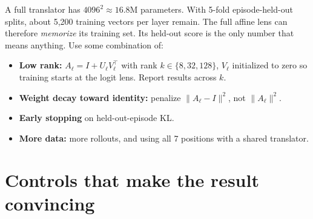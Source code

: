 \documentclass[11pt]{article}
\begin{document}
\begin{pitfall}
A full translator has $4096^2 \approx 16.8$M parameters. With 5-fold episode-held-out splits, about 5{,}200 training vectors per layer remain. The full affine lens can therefore \emph{memorize} its training set. Its held-out score is the only number that means anything. Use some combination of:
\begin{itemize}
  \item \textbf{Low rank:} $A_\ell = I + U_\ell V_\ell^\top$ with rank $k\in\{8, 32, 128\}$, $V_\ell$ initialized to zero so training starts at the logit lens. Report results across $k$.
  \item \textbf{Weight decay toward identity:} penalize $\|A_\ell - I\|^2$, not $\|A_\ell\|^2$.
  \item \textbf{Early stopping} on held-out-episode KL.
  \item \textbf{More data:} more rollouts, and using all 7 positions with a shared translator.
\end{itemize}
\end{pitfall}

\section{Controls that make the result convincing}
\end{document}
